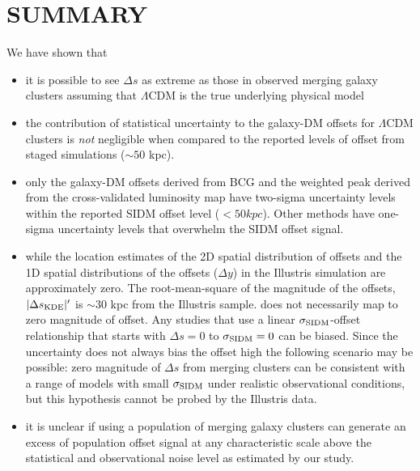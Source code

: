 \section{SUMMARY}
We have shown that 
\begin{itemize}
		\item it is possible to  
			see $\Delta s$ as extreme as those in observed merging galaxy clusters assuming that
			$\Lambda$CDM is the true underlying physical model  \\

		\item the contribution of statistical uncertainty to the galaxy-DM offsets 
			for $\Lambda$CDM clusters is {\it not} negligible when compared to the reported
			levels of offset from staged simulations ($\sim 50$ kpc).\\ 

		\item only the galaxy-DM offsets derived from BCG and the weighted peak
			derived from the cross-validated
			luminosity map have two-sigma uncertainty levels within the reported SIDM offset
			level ($< 50 kpc$). Other methods have one-sigma uncertainty levels that overwhelm the
			SIDM offset signal.\\ 

		\item while the location estimates of the 2D spatial distribution of offsets and the
			1D spatial distributions of the offsets ($\Delta y$) in the Illustris
			simulation are approximately zero.
			The root-mean-square of the magnitude of the
		offsets, $|\Delta s_{\rm KDE}|'$ is $\sim 30$ kpc from the Illustris sample. 
			does not necessarily map to zero magnitude of offset.  
			Any studies that use a linear $\sigma_{\rm SIDM}$-offset relationship
			that starts with $\Delta s = 0$ to $\sigma_{\rm SIDM} = 0$ can be biased. 
			Since the uncertainty does not always bias the offset high 
		the following scenario may be possible: zero magnitude of
			$\Delta s$ from merging clusters 
			can be consistent with a range of models with small
			$\sigma_{\rm SIDM}$ under realistic observational conditions,
			but this hypothesis cannot be probed by the Illustris data.\\
  
	 \item it is unclear if using a population of merging galaxy clusters 
		 can generate an excess of population offset signal at any characteristic
		 scale above the statistical
		 and observational noise level as estimated by our study.   
			\\



\end{itemize}
